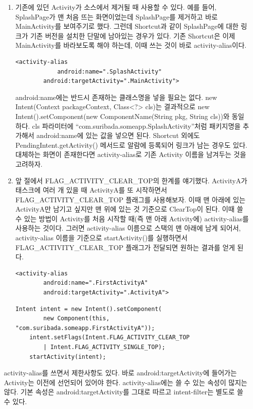 \begin{enumerate}
\item 기존에 있던 Activity가 소스에서 제거될 때 사용할 수 있다.
예를 들어, SplashPage가 맨 처음 뜨는 화면이었는데 SplashPage를 제거하고 바로 MainActivity를 보여주기로 했다.
그런데 Shortcut과 같이 SplashPage에 대한 링크가 기존 버전을 설치한 단말에 남아있는 경우가 있다.
기존 Shortcut은 이제 MainActivity를 바라보도록 해야 하는데, 이때 쓰는 것이 바로 activity-alias이다.
\begin{lstlisting}[frame=single]
	<activity-alias
    		android:name=".SplashActivity"
        android:targetActivity=".MainActivity">
\end{lstlisting}
android:name에는 반드시 존재하는 클래스명을 넣을 필요는 없다. new Intent(Context packageContext, Class<?> cls)는 결과적으로 new Intent().setComponent(new ComponentName(String pkg, String cls))와 동일하다. 
cls 파라미터에  ``com.suribada.someapp.Splash\-Activity''처럼 패키지명을 추가해서 android:name에 있는 값을 넣으면 된다. 
Shortcut 외에도 PendingIntent.getActivity() 메서드로 알람에 등록되어 링크가 남는 경우도 있다. 대체하는 화면이 존재한다면 activity-alias로 기존 Activity 이름을 남겨두는 것을 고려하자.

\item 앞 절에서 FLAG\_ACTIVITY\_CLEAR\_TOP의 한계를 얘기했다. ActivityA가 태스크에 여러 개 있을 때 ActivityA를 또 시작하면서 FLAG\_ACTIVITY\_CLEAR\_TOP 플래그를 사용해보자. 이때 맨 아래에 있는 ActivityA만 남기고 싶지만 맨 위에 있는 것 기준으로 ClearTop이 된다.
이때 쓸 수 있는 방법이 Activity를 처음 시작할 때(즉 맨 아래 Activity에) activity-alias를 사용하는 것이다. 그러면 activity-alias 이름으로 스택의 맨 아래에 남게 되어서, activity-alias 이름을 기준으로 startActivity()를 실행하면서 FLAG\_ACTIVITY\_CLEAR\_TOP 플래그가 전달되면 원하는 결과를 얻게 된다.
\begin{lstlisting}[frame=single]
	<activity-alias
    	android:name=".FirstActivityA"
        android:targetActivity=".ActivityA">
\end{lstlisting}
\begin{lstlisting}[frame=single]
	Intent intent = new Intent().setComponent(
		new Component(this, "com.suribada.someapp.FirstActivityA"));
	intent.setFlags(Intent.FLAG_ACTIVITY_CLEAR_TOP 
		| Intent.FLAG_ACTIVITY_SINGLE_TOP);
	startActivity(intent);
\end{lstlisting}
\end{enumerate} 

activity-alias를 쓰면서 제한사항도 있다.
바로 android:targetActivity에 들어가는 Activity는 이전에 선언되어 있어야 한다. 
activity-alias에는 쓸 수 있는 속성이 많지는 않다. 기본 속성은 android:targetActivity를 그대로 따르고 intent-filter는 별도로 쓸 수 있다.




